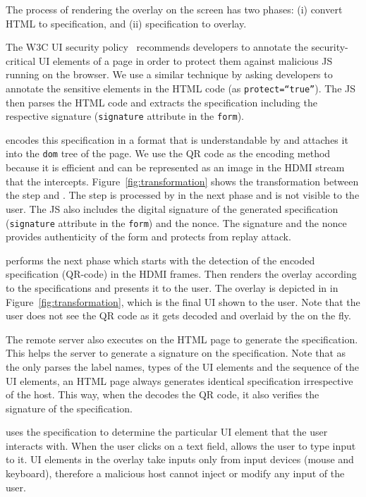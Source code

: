 The process of rendering the overlay on the screen has two phases: (i) convert HTML to specification, and (ii) specification to overlay.

 The W3C UI security policy~\cite{w3c_spec} recommends developers to annotate the security-critical UI elements of a page in order to protect them against malicious JS running on the browser. We use a similar technique by asking developers to annotate the sensitive elements in the HTML code (as \texttt{protect=``true''}). The \name JS then parses the HTML code and extracts the specification including the respective signature (\texttt{signature} attribute in the \texttt{form}). 

\name \js encodes this specification in a format that is understandable by \device and attaches it into the \texttt{dom} tree of the page. We use the QR code as the encoding method because it is efficient and can be represented as an image in the HDMI stream that the \device intercepts. Figure~\ref{fig:transformation} shows the transformation between the step \one and \two. The step \two is processed by \device in the next phase and is not visible to the user. The \name JS also includes the digital signature of the generated specification (\texttt{signature} attribute in the \texttt{form}) and the nonce. The signature and the nonce provides authenticity of the form and protects from replay attack.


 \device performs the next phase which starts with the detection of the encoded specification (QR-code) in the HDMI frames. Then \device renders the overlay according to the specifications and presents it to the user. 
The \device overlay is depicted in \three in Figure~\ref{fig:transformation}, which is the final UI shown to the user. Note that the user does not see the QR code as it gets decoded and overlaid by the \device on the fly.

 The remote server also executes \name \js on the HTML page to generate the specification. This helps the server to generate a signature on the specification. Note that as the \name \js only parses the label names, types of the UI elements and the sequence of the UI elements, an HTML page always generates identical specification irrespective of the host. This way, when the \device decodes the QR code, it also verifies the signature of the specification.

\device uses the specification to determine the particular UI element that the user interacts with. When the user clicks on a text field, \device allows the user to type input to it. UI elements in the overlay take inputs only from input devices (mouse and keyboard), therefore a malicious host cannot inject or modify any input of the user.


